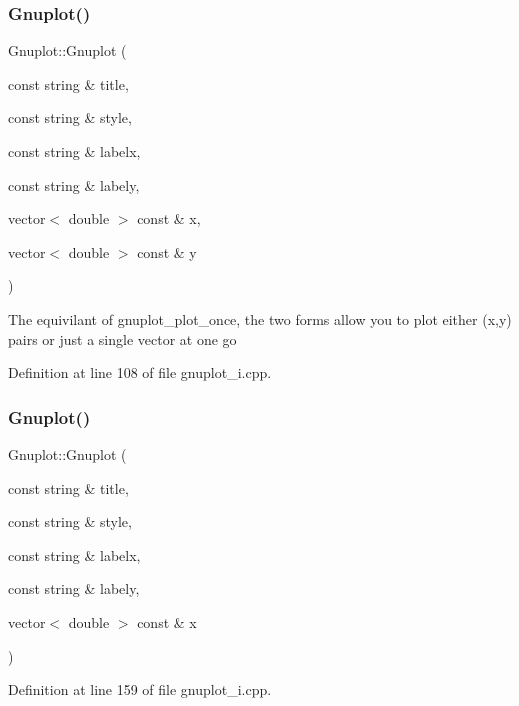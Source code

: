 \subsubsection{\texorpdfstring{Gnuplot()}{Gnuplot()}\hspace{0.1cm}{\footnotesize\ttfamily [3/4]}}
{\footnotesize\ttfamily Gnuplot\+::\+Gnuplot (\begin{DoxyParamCaption}\item[{const string \&}]{title,  }\item[{const string \&}]{style,  }\item[{const string \&}]{labelx,  }\item[{const string \&}]{labely,  }\item[{vector$<$ double $>$ const \&}]{x,  }\item[{vector$<$ double $>$ const \&}]{y }\end{DoxyParamCaption})}

The equivilant of gnuplot\+\_\+plot\+\_\+once, the two forms allow you to plot either (x,y) pairs or just a single vector at one go 

Definition at line 108 of file gnuplot\+\_\+i.\+cpp.

\mbox{\label{class_gnuplot_a7c87a9e55a3cdc5c559d07744d9856f8}} 
\subsubsection{\texorpdfstring{Gnuplot()}{Gnuplot()}\hspace{0.1cm}{\footnotesize\ttfamily [4/4]}}
{\footnotesize\ttfamily Gnuplot\+::\+Gnuplot (\begin{DoxyParamCaption}\item[{const string \&}]{title,  }\item[{const string \&}]{style,  }\item[{const string \&}]{labelx,  }\item[{const string \&}]{labely,  }\item[{vector$<$ double $>$ const \&}]{x }\end{DoxyParamCaption})}



Definition at line 159 of file gnuplot\+\_\+i.\+cpp.

\mbox{\label{class_gnuplot_a78a68f621caa87d1f34324fcd093c7bd}} 
